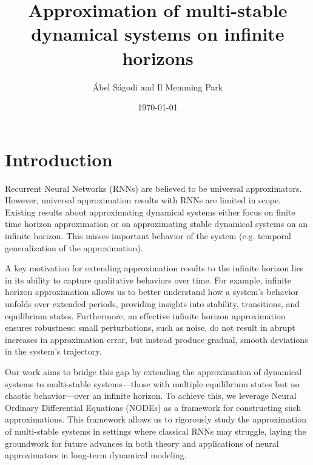 \documentclass{article}
\title{Approximation of multi-stable dynamical systems on infinite horizons}
\author{\'Abel S\'agodi and Il Memming Park}
\date{\today}
\theoremstyle{definition}
\theoremstyle{remark}
\begin{document}
\maketitle

\section{Introduction}
Recurrent Neural Networks (RNNs) are believed to be universal approximators.
However, universal approximation results with RNNs are limited in scope.
Existing results about approximating dynamical systems either focus on finite time horizon approximation or on approximating stable dynamical systems on an infinite horizon.
This misses important behavior of the system (e.g. temporal generalization of the approximation).


A key motivation for extending approximation results to the infinite horizon lies in its ability to capture qualitative behaviors over time. For example, infinite horizon approximation allows us to better understand how a system's behavior unfolds over extended periods, providing insights into stability, transitions, and equilibrium states.
 Furthermore, an effective infinite horizon approximation ensures robustness: small perturbations, such as noise, do not result in abrupt increases in approximation error, but instead produce gradual, smooth deviations in the system's trajectory.

Our work aims to bridge this gap by extending the approximation of dynamical systems to multi-stable systems—those with multiple equilibrium states but no chaotic behavior—over an infinite horizon. 
To achieve this, we leverage Neural Ordinary Differential Equations (NODEs) as a framework for constructing such approximations.
This framework allows us to rigorously study the approximation of multi-stable systems in settings where classical RNNs may struggle, laying the groundwork for future advances in both theory and applications of neural approximators in long-term dynamical modeling.

\end{document}
